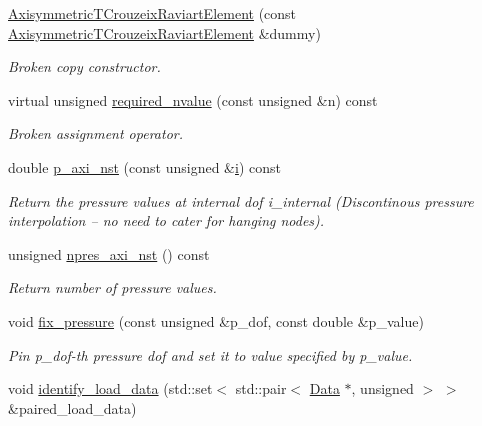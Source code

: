 \begin{DoxyCompactItemize}
\hyperlink{classoomph_1_1AxisymmetricTCrouzeixRaviartElement_abf77290ac8634231d0cbe1f2058d29ea}{Axisymmetric\+T\+Crouzeix\+Raviart\+Element} (const \hyperlink{classoomph_1_1AxisymmetricTCrouzeixRaviartElement}{Axisymmetric\+T\+Crouzeix\+Raviart\+Element} \&dummy)
\begin{DoxyCompactList}\small\item\em Broken copy constructor. \end{DoxyCompactList}\item 
virtual unsigned \hyperlink{classoomph_1_1AxisymmetricTCrouzeixRaviartElement_a2f942f09a7d541e2a2ed9f33df53b7cc}{required\+\_\+nvalue} (const unsigned \&n) const
\begin{DoxyCompactList}\small\item\em Broken assignment operator. \end{DoxyCompactList}\item 
double \hyperlink{classoomph_1_1AxisymmetricTCrouzeixRaviartElement_a50bbe7b609760f1e41ef35756ef70b31}{p\+\_\+axi\+\_\+nst} (const unsigned \&\hyperlink{cfortran_8h_adb50e893b86b3e55e751a42eab3cba82}{i}) const
\begin{DoxyCompactList}\small\item\em Return the pressure values at internal dof i\+\_\+internal (Discontinous pressure interpolation -- no need to cater for hanging nodes). \end{DoxyCompactList}\item 
unsigned \hyperlink{classoomph_1_1AxisymmetricTCrouzeixRaviartElement_a2614b5ab31a1cbac9a7f7887ce24c11a}{npres\+\_\+axi\+\_\+nst} () const
\begin{DoxyCompactList}\small\item\em Return number of pressure values. \end{DoxyCompactList}\item 
void \hyperlink{classoomph_1_1AxisymmetricTCrouzeixRaviartElement_a52bb17bda3d40b84947bf6ef14df26af}{fix\+\_\+pressure} (const unsigned \&p\+\_\+dof, const double \&p\+\_\+value)
\begin{DoxyCompactList}\small\item\em Pin p\+\_\+dof-\/th pressure dof and set it to value specified by p\+\_\+value. \end{DoxyCompactList}\item 
void \hyperlink{classoomph_1_1AxisymmetricTCrouzeixRaviartElement_a657cd924a28eea29fcba515f23c0e34c}{identify\+\_\+load\+\_\+data} (std\+::set$<$ std\+::pair$<$ \hyperlink{classoomph_1_1Data}{Data} $\ast$, unsigned $>$ $>$ \&paired\+\_\+load\+\_\+data)

\end{DoxyCompactItemize}
